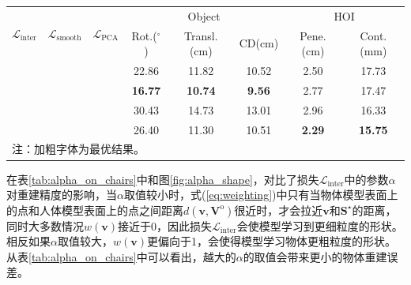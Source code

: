 \begin{table}[!htbp]
	\label{tab:training_loss_chairs}
	\centering
	\footnotesize
	\setlength{\tabcolsep}{4pt}
	\renewcommand{\arraystretch}{1.2}
	\begin{tabular}{cccccccc}
		\toprule
		\multirow{2}{*}{$\mathcal{L}_{\text{inter}}$} & \multirow{2}{*}{$\mathcal{L}_{\text{smooth}}$} & \multirow{2}{*}{$\mathcal{L}_{\text{PCA}}$} & \multicolumn{3}{c}{Object} & \multicolumn{2}{c}{HOI} \\
		& &  & Rot.($^\circ$) & Transl.(cm) & CD(cm) & Pene.(cm) & Cont.(mm) \\
		\hline
		\XSolidBrush & \Checkmark & \Checkmark & 22.86 & 11.82 & 10.52 & 2.50 & 17.73 \\
		\Checkmark & \XSolidBrush & \Checkmark & \textbf{16.77} & \textbf{10.74} & \textbf{9.56} & 2.77 & 17.47 \\
		\Checkmark & \Checkmark & \XSolidBrush & 30.43 & 14.73 & 13.01 & 2.96 & 16.33 \\
		\Checkmark & \Checkmark & \Checkmark & 26.40 & 11.30 & 10.51 & \textbf{2.29} & \textbf{15.75} \\
		\bottomrule
		\multicolumn{6}{l}{注：加粗字体为最优结果。}
	\end{tabular}
\end{table}

在表\ref{tab:alpha_on_chairs}中和图\ref{fig:alpha_shape}，对比了损失$\mathcal{L}_{\text{inter}}$中的参数$\alpha$对重建精度的影响，当$\alpha$取值较小时，式(\ref{eq:weighting})中只有当物体模型表面上的点和人体模型表面上的点之间距离$d(\mathbf{v}, \mathbf{V}^{\text{o}})$很近时，才会拉近$\mathbf{v}$和$\mathbf{S}^\star$的距离，同时大多数情况$w(\mathbf{v})$接近于0，因此损失$\mathcal{L}_{\text{inter}}$会使模型学习到更细粒度的形状。相反如果$\alpha$取值较大，$w(\mathbf{v})$更偏向于1，会使得模型学习物体更粗粒度的形状。从表\ref{tab:alpha_on_chairs}中可以看出，越大的$\alpha$的取值会带来更小的物体重建误差。

